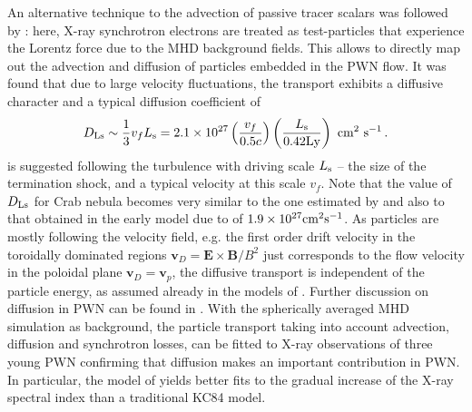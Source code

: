 An alternative technique to the advection of passive tracer scalars was followed by \cite{PorthVorster2016}: here, X-ray synchrotron electrons are treated as test-particles that experience the Lorentz force due to the MHD background fields.  This allows to directly map out the advection and diffusion of particles embedded in the PWN flow.  It was found that due to large velocity fluctuations, the transport exhibits a diffusive character and a typical diffusion coefficient of 
\begin{align}
D_{\rm Ls} \sim \frac{1}{3} v_f L_{\rm s} = 2.1 \times 10^{27}\left(\frac{v_f}{0.5c}\right)\left(\frac{L_{\rm s}}{0.42\rm Ly}\right)\ \rm cm^2~s^{-1}\, .\label{eq:DE}
\end{align}
is suggested following the turbulence with driving scale $L_{\rm s}$ -- the size of the termination shock, and a typical velocity at this scale $v_f$.  
Note that the value of $D_{\rm Ls}$ for Crab nebula becomes very similar to the one estimated by \citep{AmatoEtAl00} and also to that obtained in the early model due to \cite{WeinbergSilk1976} of $1.9 \times 10^{27}\rm cm^2 s^{-1}$.  
As particles are mostly following the velocity field, e.g. the  first order drift velocity in the toroidally dominated regions $\mathbf{v}_D=\mathbf{E\times B}/B^2$ just corresponds to the flow velocity in the poloidal plane $\mathbf{v}_D=\mathbf{v}_p$, the diffusive transport is independent of the particle energy, as assumed already in the models of \cite{gratton1972,Wilson1972}.  Further discussion on diffusion in PWN can be found in \citep{tang2012}. 
 With the spherically averaged MHD simulation as background, the particle transport taking into account advection, diffusion and synchrotron losses, can be fitted to X-ray observations of three young PWN confirming that diffusion makes an important contribution in PWN. In particular, the model of \cite{PorthVorster2016} yields better fits to the gradual increase of the X-ray spectral index than a traditional KC84 model.  
